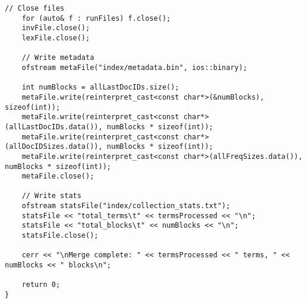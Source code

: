 \documentclass{article}
\begin{document}
\begin{lstlisting}[caption={The complete source code for the merger component.}, label={lst:merger}]
    // Close files
    for (auto& f : runFiles) f.close();
    invFile.close();
    lexFile.close();
    
    // Write metadata
    ofstream metaFile("index/metadata.bin", ios::binary);
    
    int numBlocks = allLastDocIDs.size();
    metaFile.write(reinterpret_cast<const char*>(&numBlocks), sizeof(int));
    metaFile.write(reinterpret_cast<const char*>(allLastDocIDs.data()), numBlocks * sizeof(int));
    metaFile.write(reinterpret_cast<const char*>(allDocIDSizes.data()), numBlocks * sizeof(int));
    metaFile.write(reinterpret_cast<const char*>(allFreqSizes.data()),  numBlocks * sizeof(int));
    metaFile.close();
    
    // Write stats
    ofstream statsFile("index/collection_stats.txt");
    statsFile << "total_terms\t" << termsProcessed << "\n";
    statsFile << "total_blocks\t" << numBlocks << "\n";
    statsFile.close();
    
    cerr << "\nMerge complete: " << termsProcessed << " terms, " << numBlocks << " blocks\n";
    
    return 0;
}
\end{lstlisting}
\end{document}

